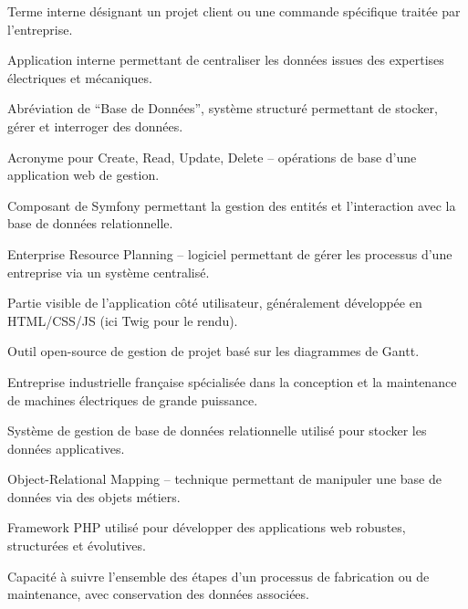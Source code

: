 \documentclass[11pt,a4paper]{article}
\begin{document}
\begin{description}[leftmargin=2cm,labelindent=0cm]

\item[Affaire :] Terme interne désignant un projet client ou une commande spécifique traitée par l’entreprise.

\item[Base d’expertise :] Application interne permettant de centraliser les données issues des expertises électriques et mécaniques.

\item[BDD :] Abréviation de “Base de Données”, système structuré permettant de stocker, gérer et interroger des données.

\item[CRUD :] Acronyme pour Create, Read, Update, Delete – opérations de base d’une application web de gestion.

\item[Doctrine :] Composant de Symfony permettant la gestion des entités et l’interaction avec la base de données relationnelle.

\item[ERP :] Enterprise Resource Planning – logiciel permettant de gérer les processus d’une entreprise via un système centralisé.

\item[Front-end :] Partie visible de l’application côté utilisateur, généralement développée en HTML/CSS/JS (ici Twig pour le rendu).

\item[GanttProject :] Outil open-source de gestion de projet basé sur les diagrammes de Gantt.

\item[Jeumont Electric :] Entreprise industrielle française spécialisée dans la conception et la maintenance de machines électriques de grande puissance.

\item[MySQL :] Système de gestion de base de données relationnelle utilisé pour stocker les données applicatives.

\item[ORM :] Object-Relational Mapping – technique permettant de manipuler une base de données via des objets métiers.

\item[Symfony :] Framework PHP utilisé pour développer des applications web robustes, structurées et évolutives.

\item[Traçabilité :] Capacité à suivre l’ensemble des étapes d’un processus de fabrication ou de maintenance, avec conservation des données associées.


\end{description}
\end{document}
